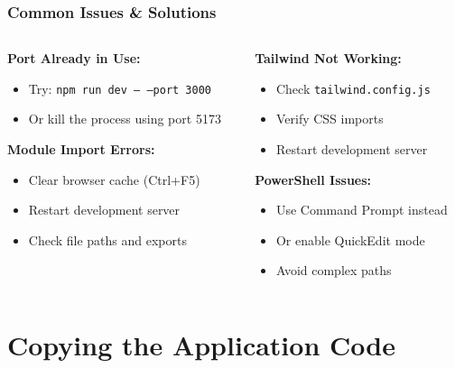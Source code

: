 \documentclass[aspectratio=169]{beamer}
\begin{document}
\begin{frame}
\frametitle{Common Issues \& Solutions}
\begin{columns}
\begin{column}{0.5\textwidth}
\textbf{Port Already in Use:}
\begin{itemize}
\item Try: \texttt{npm run dev -- --port 3000}
\item Or kill the process using port 5173
\end{itemize}

\textbf{Module Import Errors:}
\begin{itemize}
\item Clear browser cache (Ctrl+F5)
\item Restart development server
\item Check file paths and exports
\end{itemize}
\end{column}
\begin{column}{0.5\textwidth}
\textbf{Tailwind Not Working:}
\begin{itemize}
\item Check \texttt{tailwind.config.js}
\item Verify CSS imports
\item Restart development server
\end{itemize}

\textbf{PowerShell Issues:}
\begin{itemize}
\item Use Command Prompt instead
\item Or enable QuickEdit mode
\item Avoid complex paths
\end{itemize}
\end{column}
\end{columns}
\end{frame}

\section{Copying the Application Code}
\end{document}
